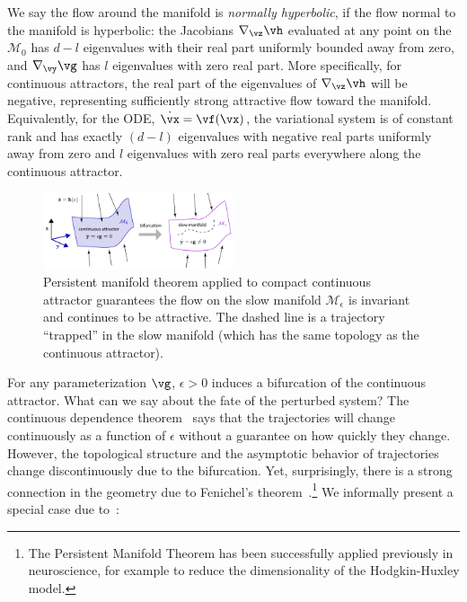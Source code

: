 \documentclass{article} %
\newcounter{ct}
\newcommand{\manifold}{\mathcal{M}}
\theoremstyle{definition}
\theoremstyle{remark}
\renewcommand{\cite}{\citep}
\begin{document}
We say the flow around the manifold is \emph{normally hyperbolic}, if the flow normal to the manifold is hyperbolic: the Jacobians \(\nabla_{\vz} \vh\) evaluated at any point on the \(\manifold_{0}\) has \(d - l\) eigenvalues with their real part uniformly bounded away from zero, and \(\nabla_{\vy} \vg\) has \(l\) eigenvalues with zero real part.
More specifically, for continuous attractors, the real part of the eigenvalues of \(\nabla_{\vz} \vh\) will be negative, representing sufficiently strong attractive flow toward the manifold.
Equivalently, for the ODE, \(\dot{\vx} = \vf(\vx)\), the variational system is of constant rank and has exactly \((d - l)\) eigenvalues with negative real parts uniformly away from zero and \(l\) eigenvalues with zero real parts everywhere along the continuous attractor.



\setlength\belowcaptionskip{-5ex}
\begin{figure}
  \centering
  \includegraphics[width=0.5\textwidth]{FenichelThm}
  \caption{
    Persistent manifold theorem applied to compact continuous attractor guarantees the flow on the slow manifold \(\manifold_{\epsilon}\) is invariant and continues to be attractive.
    The dashed line is a trajectory ``trapped'' in the slow manifold (which has the same topology as the continuous attractor). %
  }\label{fig:fenichel}
\end{figure}

For any parameterization \(\vg\), \(\epsilon > 0\) induces a bifurcation of the continuous attractor.
What can we say about the fate of the perturbed system?
The continuous dependence theorem~\citep{Chicone2006} says that the trajectories will change continuously as a function of \(\epsilon\) without a guarantee on how quickly they change.
However, the topological structure and the asymptotic behavior of trajectories change discontinuously due to the bifurcation.
Yet, surprisingly, there is a strong connection in the geometry due to Fenichel's theorem~\cite{fenichel1971}.\footnote{The Persistent Manifold Theorem has been successfully applied previously in neuroscience\citep{Kopell1996,ermentrout2010}, for example to reduce the dimensionality of the Hodgkin-Huxley model\citep{rinzel1985excitation,ermentrout1986parabolic}.}
We informally present a special case due to~\citet{Jones1995}:
\end{document}
